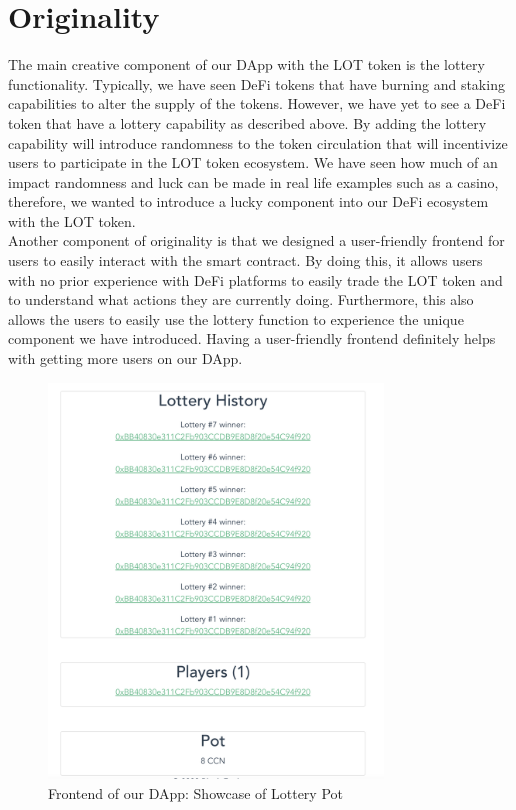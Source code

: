 \documentclass[11pt]{article}
\begin{document}
\section*{Originality}
The main creative component of our DApp with the LOT token is the lottery functionality. Typically, we have seen DeFi tokens that have burning and staking capabilities to alter the supply of the tokens. However, we have yet to see a DeFi token that have a lottery capability as described above. By adding the lottery capability will introduce randomness to the token circulation that will incentivize users to participate in the LOT token ecosystem. We have seen how much of an impact randomness and luck can be made in real life examples such as a casino, therefore, we wanted to introduce a lucky component into our DeFi ecosystem with the LOT token. \\
Another component of originality is that we designed a user-friendly frontend for users to easily interact with the smart contract. By doing this, it allows users with no prior experience with DeFi platforms to easily trade the LOT token and to understand what actions they are currently doing. Furthermore, this also allows the users to easily use the lottery function to experience the unique component we have introduced. Having a user-friendly frontend definitely helps with getting more users on our DApp.\\

\begin{figure}[!t]
\centering
\includegraphics[width=3.5in]{figure3.png}
\caption{Frontend of our DApp: Showcase of Lottery Pot}
\label{fig:fig3}
\end{figure}
\end{document}
